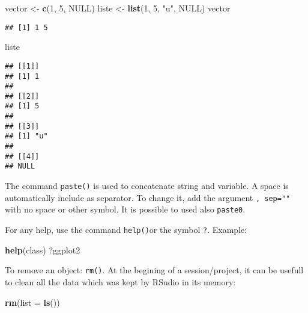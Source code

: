 \documentclass[
]{article}
\newenvironment{Shaded}{\begin{snugshade}}{\end{snugshade}}
\newcommand{\AttributeTok}[1]{\textcolor[rgb]{0.13,0.29,0.53}{#1}}
\newcommand{\ConstantTok}[1]{\textcolor[rgb]{0.56,0.35,0.01}{#1}}
\newcommand{\DecValTok}[1]{\textcolor[rgb]{0.00,0.00,0.81}{#1}}
\newcommand{\FunctionTok}[1]{\textcolor[rgb]{0.13,0.29,0.53}{\textbf{#1}}}
\newcommand{\NormalTok}[1]{#1}
\newcommand{\OtherTok}[1]{\textcolor[rgb]{0.56,0.35,0.01}{#1}}
\newcommand{\StringTok}[1]{\textcolor[rgb]{0.31,0.60,0.02}{#1}}
\begin{document}
\begin{Shaded}
\begin{Highlighting}[]
\NormalTok{vector }\OtherTok{\textless{}{-}} \FunctionTok{c}\NormalTok{(}\DecValTok{1}\NormalTok{, }\DecValTok{5}\NormalTok{, }\ConstantTok{NULL}\NormalTok{)}
\NormalTok{liste }\OtherTok{\textless{}{-}} \FunctionTok{list}\NormalTok{(}\DecValTok{1}\NormalTok{, }\DecValTok{5}\NormalTok{, }\StringTok{"u"}\NormalTok{, }\ConstantTok{NULL}\NormalTok{)}
\NormalTok{vector}
\end{Highlighting}
\end{Shaded}

\begin{verbatim}
## [1] 1 5
\end{verbatim}

\begin{Shaded}
\begin{Highlighting}[]
\NormalTok{liste}
\end{Highlighting}
\end{Shaded}

\begin{verbatim}
## [[1]]
## [1] 1
## 
## [[2]]
## [1] 5
## 
## [[3]]
## [1] "u"
## 
## [[4]]
## NULL
\end{verbatim}

The command \texttt{paste()} is used to concatenate string and variable.
A space is automatically include as separator. To change it, add the
argument \texttt{,\ sep=""} with no space or other symbol. It is
possible to used also \texttt{paste0}.

For any help, use the command \texttt{help()}or the symbol \texttt{?}.
Example:

\begin{Shaded}
\begin{Highlighting}[]
\FunctionTok{help}\NormalTok{(class)}
\NormalTok{?ggplot2}
\end{Highlighting}
\end{Shaded}

To remove an object: \texttt{rm()}. At the begining of a
session/project, it can be usefull to clean all the data which was kept
by RSudio in its memory:

\begin{Shaded}
\begin{Highlighting}[]
\FunctionTok{rm}\NormalTok{(}\AttributeTok{list =} \FunctionTok{ls}\NormalTok{())}
\end{Highlighting}
\end{Shaded}
\end{document}

